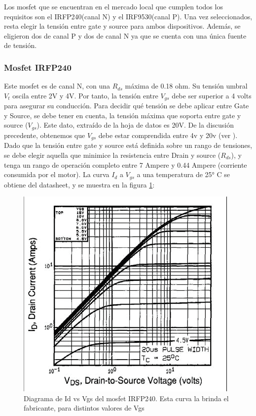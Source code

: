 Los mosfet que se encuentran en el mercado local que cumplen todos los requisitos son el IRFP240(canal N) y el IRF9530(canal P). Una vez seleccionados, resta elegir la tensión entre gate y source para ambos dispositivos. Además, se eligieron dos de canal P y dos de canal N ya que se cuenta con una única fuente de tensión. 


\subsubsection{Mosfet IRFP240} \label{sub:irfp240}

Este mosfet es de canal N, con una $R_{ds}$ máxima de 0.18 ohm. Su tensión umbral $V_{t}$ oscila entre 2V y 4V. Por tanto, la tensión entre $V_{gs}$ debe ser superior a 4 volts para asegurar su conducción. Para decidir qué tensión se debe aplicar entre Gate y Source, se debe tener en cuenta, la tensión máxima que soporta entre gate y source ($V_{gs}$). Este dato, extraído de la hoja de datos es 20V. De la discusión precedente, obtenemos que $V_{gs}$ debe estar comprendida entre 4v y 20v (ver \cite{IRFP240}). 
Dado que la tensión entre gate y source está definida sobre un rango de tensiones, se debe elegir aquella que minimice la resistencia entre Drain y source ($R_{ds}$), y tenga un rango de operación completo entre 7 Ampere y 0.44 Ampere (corriente consumida por el motor). La curva $I_d$ a $V_{gs}$ a una temperatura de 25° C se obtiene del datasheet, y se muestra en la figura \ref{fig:irfp_240_id_vs_vds}: 

\begin{figure}[ht!]
	\centering
	\includegraphics{curva_datasheet_1} 
	\caption{Diagrama de Id vs Vgs del mosfet IRFP240. Esta curva la brinda el fabricante, para distintos valores de Vgs}
	\label{fig:irfp_240_id_vs_vds}
\end{figure}

